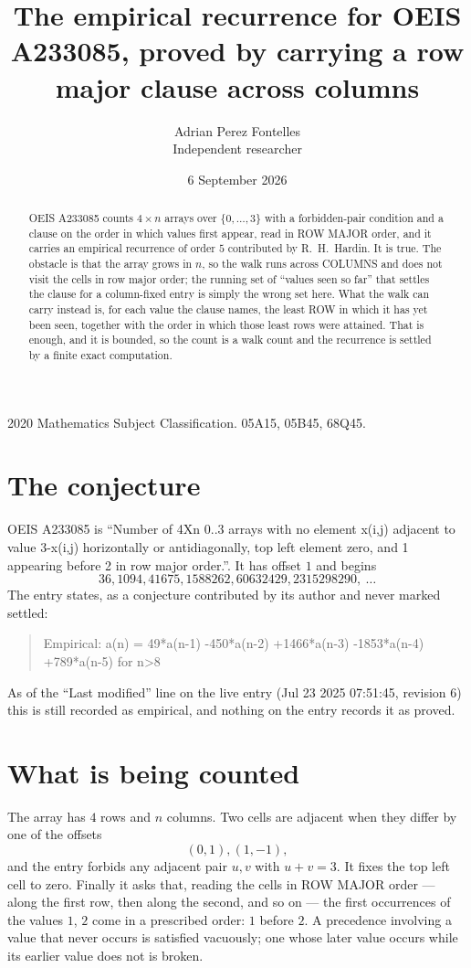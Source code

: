 \documentclass[11pt,a4paper]{article}
\title{The empirical recurrence for OEIS A233085, proved by carrying a row major clause across
columns}
\author{Adrian Perez Fontelles\\ \small Independent researcher}
\date{6 September 2026}
\theoremstyle{plain}
\theoremstyle{definition}
\begin{document}
\maketitle

\begin{abstract}
OEIS A233085 counts $4\times n$ arrays over $\{0,\dots,3\}$ with a forbidden-pair
condition and a clause on the order in which values first appear, read in ROW MAJOR order, and
it carries an empirical recurrence of order $5$ contributed by R.~H.~Hardin. It is true.
The obstacle is that the array grows in $n$, so the walk runs across COLUMNS and does not visit
the cells in row major order; the running set of ``values seen so far'' that settles the clause
for a column-fixed entry is simply the wrong set here. What the walk can carry instead is, for
each value the clause names, the least ROW in which it has yet been seen, together with the
order in which those least rows were attained. That is enough, and it is bounded, so the count
is a walk count and the recurrence is settled by a finite exact computation.
\end{abstract}

\noindent\small 2020 Mathematics Subject Classification. 05A15, 05B45, 68Q45.\normalsize

\section{The conjecture}

OEIS A233085 is ``Number of 4Xn 0..3 arrays with no element x(i,j) adjacent to value 3-x(i,j) horizontally or antidiagonally, top left element zero, and 1 appearing before 2 in row major order.''. It has offset $1$ and begins
\[
36, 1094, 41675, 1588262, 60632429, 2315298290,\ \dots
\]
The entry states, as a conjecture contributed by its author and never marked settled:
\begin{quote}
Empirical: a(n) = 49*a(n-1) -450*a(n-2) +1466*a(n-3) -1853*a(n-4) +789*a(n-5) for n>8
\end{quote}
As of the ``Last modified'' line on the live entry (Jul 23 2025 07:51:45, revision 6) this is still
recorded as empirical, and nothing on the entry records it as proved.

\section{What is being counted}

The array has $4$ rows and $n$ columns. Two cells are adjacent when they differ by one of the
offsets
\[
(0,1), (1,-1),
\]
and the entry forbids any adjacent pair $u,v$ with $u+v=3$. It fixes the top left cell to
zero. Finally it asks that, reading the cells in ROW MAJOR order --- along the first row, then
along the second, and so on --- the first occurrences of the values $1$, $2$ come in a
prescribed order: $1$ before $2$. A precedence involving a value that never occurs is satisfied
vacuously; one whose later value occurs while its earlier value does not is broken.
\end{document}

